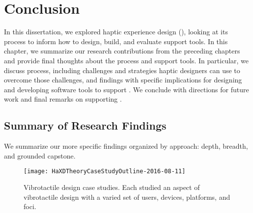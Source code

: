 \chapter{Conclusion}
\label{ch:conclusion}
In this dissertation, we explored haptic experience design (\haxd), looking at its process to inform how to design, build, and evaluate \haxd support tools.
In this chapter, we summarize our research contributions from the preceding chapters and provide final thoughts about the \haxd process and support tools.
In particular, we discuss process, including challenges and strategies haptic designers can use to overcome those challenges, and
findings with specific implications for designing and developing software tools to support \haxd.
We conclude with directions for future work and final remarks on supporting \haxd.



%
%
\section{Summary of Research Findings}
We summarize our more specific findings organized by approach: depth, breadth, and grounded capstone.


\begin{figure}[htbp]
\begin{center}
\texttt{[image: HaXDTheoryCaseStudyOutline-2016-08-11]}
\caption{Vibrotactile design case studies. Each studied an aspect of vibrotactile design with a varied set of users, devices, platforms, and foci.}
\label{fig:intro:casestudyoverview}
\end{center}
\end{figure}



